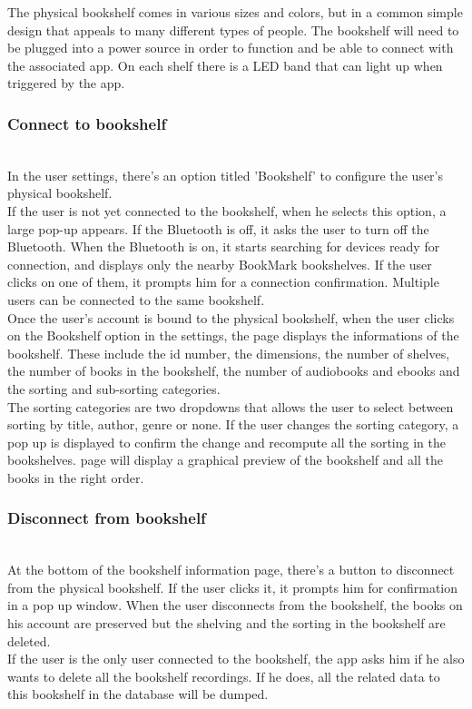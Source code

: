 \documentclass[conference]{IEEEtran}
\begin{document}
The physical bookshelf comes in various sizes and colors, but in a common simple design that appeals to many different types of people. The bookshelf will need to be plugged into a power source in order to function and be able to connect with the associated app. On each shelf there is a LED band that can light up when triggered by the app.\\

\subsubsection{Connect to bookshelf}\hfill\\
In the user settings, there's an option titled 'Bookshelf' to configure the user's physical bookshelf.\\
If the user is not yet connected to the bookshelf, when he selects this option, a large pop-up appears. If the Bluetooth is off, it asks the user to turn off the Bluetooth. When the Bluetooth is on, it starts searching for devices ready for connection, and displays only the nearby BookMark bookshelves. If the user clicks on one of them, it prompts him for a connection confirmation. Multiple users can be connected to the same bookshelf.\\
Once the user's account is bound to the physical bookshelf, when the user clicks on the Bookshelf option in the settings, the page displays the informations of the bookshelf. These include the id number, the dimensions, the number of shelves, the number of books in the bookshelf, the number of audiobooks and ebooks and the sorting and sub-sorting categories.\\
The sorting categories are two dropdowns that allows the user to select between sorting by title, author, genre or none. If the user changes the sorting category, a pop up is displayed to confirm the change and recompute all the sorting in the bookshelves. page will display a graphical preview of the bookshelf and all the books in the right order.\\

\subsubsection{Disconnect from bookshelf}\hfill\\
At the bottom of the bookshelf information page, there's a button to disconnect from the physical bookshelf. If the user clicks it, it prompts him for confirmation in a pop up window. When the user disconnects from the bookshelf, the books on his account are preserved but the shelving and the sorting in the bookshelf are deleted.\\
If the user is the only user connected to the bookshelf, the app asks him if he also wants to delete all the bookshelf recordings. If he does, all the related data to this bookshelf in the database will be dumped.\\
\end{document}

